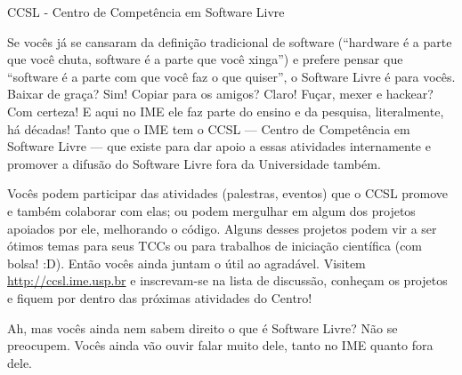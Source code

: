 \begin{secao}{CCSL - Centro de Competência em Software Livre}

Se vocês já se cansaram da definição tradicional de software (``hardware é a
parte que você chuta, software é a parte que você xinga'') e prefere pensar que
``software é a parte com que você faz o que quiser'', o Software Livre é para
vocês. Baixar de graça? Sim! Copiar para os amigos? Claro! Fuçar, mexer e
hackear? Com certeza! E aqui no IME ele faz parte do ensino e da pesquisa,
literalmente, há décadas! Tanto que o IME tem o CCSL — Centro de Competência em
Software Livre — que existe para dar apoio a essas atividades internamente e
promover a difusão do Software Livre fora da Universidade também.

Vocês podem participar das atividades (palestras, eventos) que o CCSL
promove e também colaborar com elas; ou podem mergulhar em algum dos
projetos apoiados por ele, melhorando o código. Alguns desses projetos
podem vir a ser ótimos temas para seus TCCs ou para trabalhos de
iniciação científica (com bolsa! :D). Então vocês ainda juntam o útil ao
agradável. Visitem \url{http://ccsl.ime.usp.br} e inscrevam-se na lista de discussão,
conheçam os projetos e fiquem por dentro das próximas atividades do
Centro!

Ah, mas vocês ainda nem sabem direito o que é Software Livre? Não se preocupem.
Vocês ainda vão ouvir falar muito dele, tanto no IME quanto fora dele.

\end{secao}
